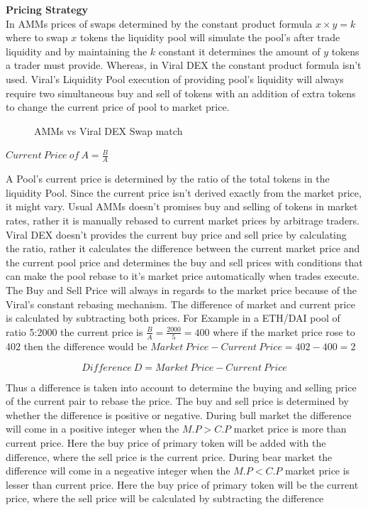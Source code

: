 \documentclass[10pt]{article}
\begin{document}
\textbf{Pricing Strategy}\\

In AMMs prices of swaps determined by the constant product formula $x \times  y=k$ where to swap $x$ tokens the liquidity pool will simulate the pool's after trade liquidity and by maintaining the $k$ constant it determines the amount of $y$ tokens a trader must provide. Whereas, in Viral DEX the constant product formula isn't used. Viral's Liquidity Pool execution of providing pool's liquidity will always require two simultaneous buy and sell of tokens with an addition of extra tokens to change the current price of pool to market price.

\begin{figure}[H]
\begin{center}
\caption{AMMs vs Viral DEX Swap match}
\end{center}
\end{figure}

\begin{center}
$Current\:Price\:of\:A = \frac{B}{A}$
\end{center}

A Pool's current price is determined by the ratio of the total tokens in the liquidity Pool. Since the current price isn't derived exactly from the market price, it might vary. Usual AMMs doesn't promises buy and selling of tokens in market rates, rather it is manually rebased to current market prices by arbitrage traders. Viral DEX doesn't provides the current buy price and sell price by calculating the ratio, rather it calculates the difference between the current market price and the current pool price and determines the buy and sell prices with conditions that can make the pool rebase to it's market price automatically when trades execute.\\

The Buy and Sell Price will always in regards to the market price because of the Viral's constant rebasing mechanism. The difference of market and current price is calculated by subtracting both prices. For Example in a ETH/DAI pool of ratio 5:2000 the current price is $\frac{B}{A}=\frac{2000}{5}=400$ where if the market price rose to 402 then the difference would be $Market\:Price - Current\:Price=402-400=2$

\begin{equation}
Difference\:D = Market\:Price - Current\:Price
\end{equation}

Thus a difference is taken into account to determine the buying and selling price of the current pair to rebase the price. The buy and sell price is determined by whether the difference is positive or negative. During bull market the difference will come in a positive integer when the $M.P>C.P$ market price is more than current price. Here the buy price of primary token will be added with the difference, where the sell price is the current price. During bear market the difference will come in a negeative integer when the $M.P<C.P$ market price is lesser than current price. Here the buy price of primary token will be the current price, where the sell price will be calculated by subtracting the difference\\
\end{document}
